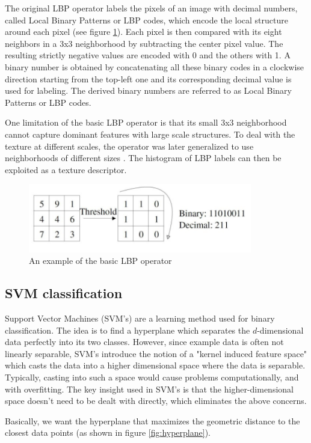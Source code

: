 \documentclass[runningheads,a4paper]{llncs}
\begin{document}
The original LBP operator labels the pixels of an image with
decimal numbers, called Local Binary Patterns or LBP codes, which encode the local structure around each pixel (see figure \ref{fig:lbp}). Each pixel is then compared with its eight neighbors in a 3x3 neighborhood by subtracting the center pixel value. The resulting strictly negative values are encoded with 0 and the others with 1. A binary number is obtained by concatenating all these binary codes in a clockwise direction starting from the top-left one and its corresponding decimal value is used for labeling. The derived binary numbers are referred to as Local Binary Patterns or LBP codes. 

One limitation of the basic LBP operator is that its small 3x3 neighborhood cannot capture dominant features with large scale structures. To deal with the texture at different scales, the operator was later generalized to use neighborhoods of different sizes \cite{Ojala}. The histogram of LBP labels can then be exploited as a texture descriptor.

\begin{figure}[h]
\centering
\includegraphics[height=3cm]{fig/LBP.png}
\caption{An example of the basic LBP operator}
\label{fig:lbp}
\end{figure}

\subsection{SVM classification}
Support Vector Machines (SVM's) \cite{Boswell2002} are a learning method used for binary classification. The idea is to find a hyperplane which separates the $d$-dimensional data perfectly into its two classes. However, since example data is often not linearly separable, SVM's introduce the notion of a "kernel induced feature space" which casts the data into a higher dimensional space where the data is separable. Typically, casting into such a space would cause problems computationally, and with overfitting. The key insight used in SVM's is that the higher-dimensional space doesn't need to be dealt with directly, which eliminates the above concerns.

Basically, we want the hyperplane that maximizes the geometric distance to the closest data points (as shown in figure \ref{fig:hyperplane}).
\end{document}
